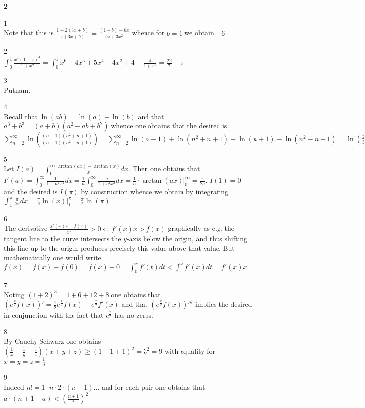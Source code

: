 \newpage

\textbf{2}

1 \\
Note that this is $\frac{1-2(3x+b)}{x(3x+b)}=\frac{(1-b)-6x}{bx+3x^2}$ whence for $\boxed{b=1}$ we obtain $\boxed{-6}$

2 \\
$\int_0^1 \frac{x^4(1-x)^4}{1+x^2} = \int_0^1 x^6-4x^5+5x^4-4x^2+4-\frac{4}{1+x^2} = \boxed{\frac{22}{7}-\pi}$

3 \\
Putnam.

4 \\
Recall that $\ln(ab)=\ln(a)+\ln(b)$ and that $a^3+b^3=(a+b)(a^2-ab+b^2)$ whence one obtains that the desired is $\sum_{n=2}^{\infty} \ln \left(\frac{(n-1)(n^2+n+1)}{(n+1)(n^2-n+1)} \right) = \sum_{n=2}^{\infty} \ln(n-1)+\ln(n^2+n+1)-\ln(n+1)-\ln(n^2-n+1) = \boxed{\ln \left(\frac{2}{3} \right)}$

5 \\
Let $I(a)=\int_0^{\infty} \frac{\arctan(ax)-\arctan(x)}{x} dx$. Then one obtains that $I'(a)=\int_0^{\infty} \frac{1}{1+a^2 x^2} dx = \frac{1}{a} \int_0^{\infty} \frac{a}{1+a^2 x^2} dx = \frac{1}{a} \cdot \arctan(ax) |_0^{\infty} = \frac{\pi}{2a}$. $I(1)=0$ and the desired is $I(\pi)$ by construction whence we obtain by integrating $\int_1^{\pi} \frac{\pi}{2x} dx = \frac{\pi}{2} \ln(x)|_1^{\pi} = \boxed{\frac{\pi}{2} \ln(\pi)}$

6 \\
The derivative $\frac{f'(x)x-f(x)}{x^2} > 0 \iff f'(x)x > f(x)$ graphically as e.g. the tangent line to the curve intersects the $y$-axis below the origin, and thus shifting this line up to the origin produces precisely this value above that value. But mathematically one would write $f(x)=f(x)-f(0)=f(x)-0=\int_0^x f'(t)dt < \int_0^x f'(x)dt = f'(x)x$

7 \\
Noting $(1+2)^3=1+6+12+8$ one obtains that $(e^{\frac{x}{2}}f(x))'=\frac{1}{2}e^{\frac{x}{2}}f(x)+e^{\frac{x}{2}}f'(x)$ and that $(e^{\frac{x}{2}}f(x))'''$ implies the desired in conjunction with the fact that $e^{\frac{x}{2}}$ has no zeros.

8 \\
By Cauchy-Schwarz one obtains $\left(\frac{1}{x}+\frac{1}{y}+\frac{1}{z} \right)(x+y+z) \ge (1+1+1)^2 = 3^2 = \boxed{9}$ with equality for $x=y=z=\frac{1}{3}$

9 \\
Indeed $n!=1 \cdot n \cdot 2 \cdot (n-1) \dots$ and for each pair one obtains that $a \cdot (n+1-a) < \left(\frac{n+1}{2} \right)^2$

